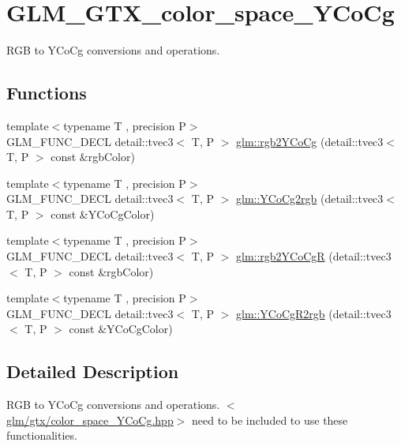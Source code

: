 \hypertarget{group__gtx__color__space___y_co_cg}{\section{G\-L\-M\-\_\-\-G\-T\-X\-\_\-color\-\_\-space\-\_\-\-Y\-Co\-Cg}
\label{group__gtx__color__space___y_co_cg}
}


R\-G\-B to Y\-Co\-Cg conversions and operations.  


\subsection*{Functions}
\begin{DoxyCompactItemize}
\item 
{\footnotesize template$<$typename T , precision P$>$ }\\G\-L\-M\-\_\-\-F\-U\-N\-C\-\_\-\-D\-E\-C\-L detail\-::tvec3$<$ T, P $>$ \hyperlink{group__gtx__color__space___y_co_cg_ga2a235b86e67866fd9fef640bcc47c93d}{glm\-::rgb2\-Y\-Co\-Cg} (detail\-::tvec3$<$ T, P $>$ const \&rgb\-Color)
\item 
{\footnotesize template$<$typename T , precision P$>$ }\\G\-L\-M\-\_\-\-F\-U\-N\-C\-\_\-\-D\-E\-C\-L detail\-::tvec3$<$ T, P $>$ \hyperlink{group__gtx__color__space___y_co_cg_gab40e31e352d2d318d3f062df2882c500}{glm\-::\-Y\-Co\-Cg2rgb} (detail\-::tvec3$<$ T, P $>$ const \&Y\-Co\-Cg\-Color)
\item 
{\footnotesize template$<$typename T , precision P$>$ }\\G\-L\-M\-\_\-\-F\-U\-N\-C\-\_\-\-D\-E\-C\-L detail\-::tvec3$<$ T, P $>$ \hyperlink{group__gtx__color__space___y_co_cg_gaeee43c2a06fe63d46a96cee4d1c63ce6}{glm\-::rgb2\-Y\-Co\-Cg\-R} (detail\-::tvec3$<$ T, P $>$ const \&rgb\-Color)
\item 
{\footnotesize template$<$typename T , precision P$>$ }\\G\-L\-M\-\_\-\-F\-U\-N\-C\-\_\-\-D\-E\-C\-L detail\-::tvec3$<$ T, P $>$ \hyperlink{group__gtx__color__space___y_co_cg_ga7b90b9b5758dbe96a82a2ef8237a17e9}{glm\-::\-Y\-Co\-Cg\-R2rgb} (detail\-::tvec3$<$ T, P $>$ const \&Y\-Co\-Cg\-Color)
\end{DoxyCompactItemize}


\subsection{Detailed Description}
R\-G\-B to Y\-Co\-Cg conversions and operations. $<$\hyperlink{color__space___y_co_cg_8hpp}{glm/gtx/color\-\_\-space\-\_\-\-Y\-Co\-Cg.\-hpp}$>$ need to be included to use these functionalities. 

